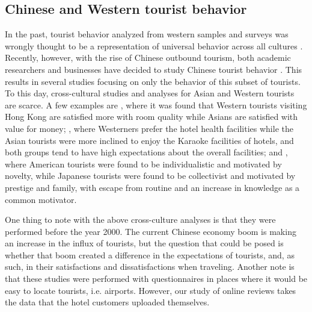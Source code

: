 \subsection{Chinese and Western tourist behavior}\label{theory_zh_en}

In the past, tourist behavior analyzed from western samples and surveys was wrongly thought to be a representation of universal behavior across all cultures \cite[][]{nielsen2017, jones2010WEIRD, guaratne2009, hogan1978biases}. Recently, however, with the rise of Chinese outbound tourism, both academic researchers and businesses have decided to study Chinese tourist behavior \cite[][]{sun2017}. This results in several studies focusing on only the behavior of this subset of tourists. To this day, cross-cultural studies and analyses for Asian and Western tourists are scarce. A few examples are \cite{choi2000}, where it was found that Western tourists visiting Hong Kong are satisfied more with room quality while Asians are satisfied with value for money; \cite{bauer1993changing}, where Westerners prefer the hotel health facilities while the Asian tourists were more inclined to enjoy the Karaoke facilities of hotels, and both groups tend to have high expectations about the overall facilities; and \cite{kim2000}, where American tourists were found to be individualistic and motivated by novelty, while Japanese tourists were found to be collectivist and motivated by prestige and family, with escape from routine and an increase in knowledge as a common motivator. 

One thing to note with the above cross-culture analyses is that they were performed before the year 2000. The current Chinese economy boom is making an increase in the influx of tourists, but the question that could be posed is whether that boom created a difference in the expectations of tourists, and, as such, in their satisfactions and dissatisfactions when traveling. Another note is that these studies were performed with questionnaires in places where it would be easy to locate tourists, i.e. airports. However, our study of online reviews takes the data that the hotel customers uploaded themselves.

